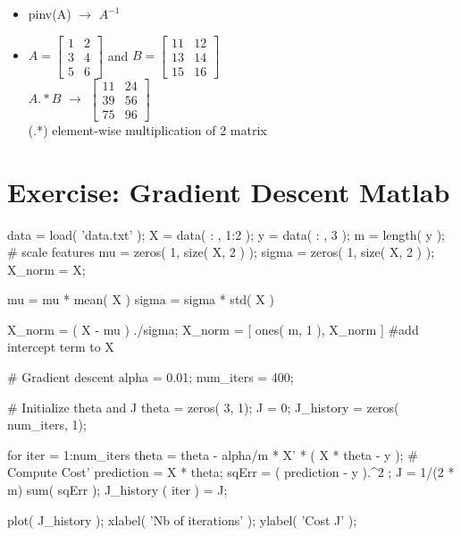 \documentclass[a4paper,12pt]{report}
\begin{document}
\begin{appendices}
\begin{itemize}
\item  pinv(A) $\rightarrow$ $A^{-1}$

\item $A = \left[ \begin{smallmatrix} 1 & 2\\ 3 & 4 \\ 5 & 6 \end{smallmatrix} \right]$ and $B = \left[ \begin{smallmatrix} 11 & 12\\ 13 & 14 \\ 15 & 16 \end{smallmatrix} \right]$ \\
$A.*B$ $\rightarrow$ $\left[ \begin{smallmatrix} 11 & 24\\ 39 & 56 \\ 75 & 96 \end{smallmatrix} \right]$ \\
(.*) element-wise multiplication of 2 matrix
\end{itemize}

\chapter{Exercise: Gradient Descent Matlab}
\begin{python}
data = load( 'data.txt' );
X = data( : , 1:2 );
y = data( : , 3 );
m = length( y );
# scale features
mu = zeros( 1, size( X, 2 ) );
sigma = zeros( 1, size( X, 2 ) );
X_norm = X;

mu = mu * mean( X )
sigma = sigma * std( X )

X_norm = ( X - mu ) ./sigma;
X_norm = [ ones( m, 1 ), X_norm ]  #add intercept term to X

# Gradient descent
alpha = 0.01;
num_iters = 400;

# Initialize theta and J
theta = zeros( 3, 1);
J = 0;
J_history = zeros( num_iters, 1);

for iter = 1:num_iters
	theta = theta - alpha/m * X' * ( X * theta - y );
  # Compute Cost'
	prediction = X * theta;
	sqErr = ( prediction - y ).^2 ;
	J = 1/(2 * m) sum( sqErr );
	J_history ( iter ) = J;

plot( J_history );
xlabel( 'Nb of iterations' );
ylabel( 'Cost J' );
\end{python}


\end{appendices}
\end{document}
